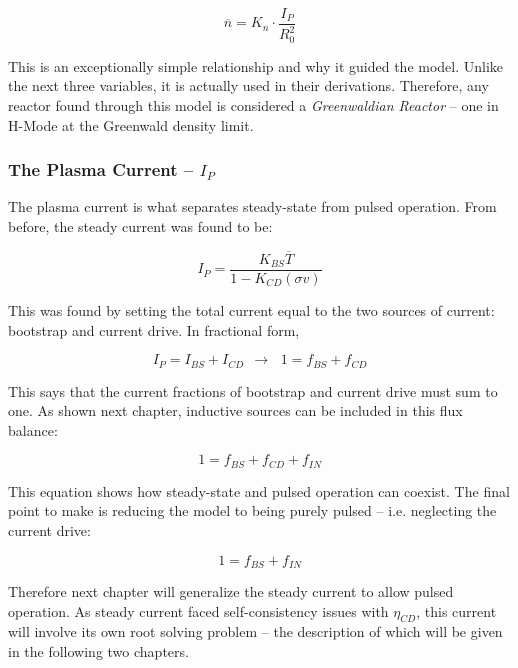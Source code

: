 \begin{equation}
	\label{eq:nbar}
	\overline n = K_n \cdot \frac{I_P}{R_0^2}
\end{equation}

This is an exceptionally simple relationship and why it guided the model. Unlike the next three variables, it is actually used in their derivations. Therefore, any reactor found through this model is considered a \emph{Greenwaldian Reactor} -- one in H-Mode at the Greenwald density limit.

\subsubsection{The Plasma Current -- $I_P$}

The plasma current is what separates steady-state from pulsed operation. From before, the steady current was found to be:

\begin{equation}
	\label{eq:steady}
	I_P = \frac{K_{BS} \overline T}{1 - K_{CD} ( \sigma v ) }
\end{equation}

This was found by setting the total current equal to the two sources of current: bootstrap and current drive. In fractional form,

\begin{equation}
	I_P = I_{BS} + I_{CD} \ \ \rightarrow \, \ \ 1 = f_{BS} + f_{CD}
\end{equation}

This says that the current fractions of bootstrap and current drive must sum to one. As shown next chapter, inductive sources can be included in this flux balance:

\begin{equation}
	1 = f_{BS} + f_{CD} + f_{IN}
\end{equation}

This equation shows how steady-state and pulsed operation can coexist. The final point to make is reducing the model to being purely pulsed -- i.e. neglecting the current drive:

\begin{equation}
	1 = f_{BS} + f_{IN}
\end{equation}

Therefore next chapter will generalize the steady current to allow pulsed operation. As steady current faced self-consistency issues with $\eta_{CD}$, this current will involve its own root solving problem -- the description of which will be given in the following two chapters.

